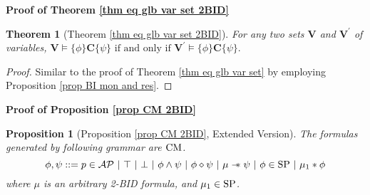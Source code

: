 \documentclass[conference,compsoc, 10pt]{IEEEtran}
\newtheorem{theorem}{Theorem}[section]
\newtheorem{proposition}{Proposition}[section]
\newcommand {\vars } {\mathbf{V}}
\newcommand {\prog } {{\mathbf{C}}}
\newcommand {\sepimp} {\mathrel{-\mkern-6mu*}}
\newcommand {\AP} {{\mathcal{AP}}}
\newcommand{\sd}{\diamond}%
\begin{document}
\begin{appendices}
		
		
		\vspace{0.5cm}
		
		\noindent\textbf{Proof of Theorem \ref{thm eq glb var set 2BID}}
		
		\begin{theorem}[Theorem \ref{thm eq glb var set 2BID}]
			For any two sets $\vars$ and $\vars^\prime$ of variables,
			$\vars\models\{\phi\}\prog\{\psi\} \text{\ if\ and\ only\ if\ }\vars^\prime\models\{\phi\}\prog\{\psi\}.$
		\end{theorem}
		
		\begin{proof}
			Similar to the proof of Theorem \ref{thm eq glb var set}  by employing Proposition \ref{prop BI mon and res}.
		\end{proof}
		
		
		
		\vspace{0.5cm}
		
		\noindent\textbf{Proof of Proposition \ref{prop CM 2BID}}
		
		\begin{proposition}[Proposition \ref{prop CM 2BID}, Extended Version] The formulas generated by following grammar are ${\rm CM}$. 
			$$
			\phi,\psi ::= p\in\AP\ |\ \top\ |\ \bot\ |\ \phi\wedge\psi\ |\ \phi\sd\psi\ |\ \mu \sepimp \psi\ |\ \phi\in{\rm SP}\ |\ \mu_1\ast\phi
			$$
			where $\mu$ is an arbitrary 2-BID formula, and $\mu_1\in {\rm SP}$.
		\end{proposition}
		

\end{appendices}
\end{document}
